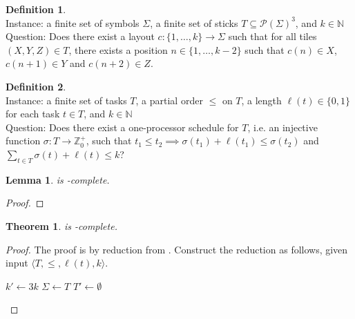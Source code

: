 \documentclass{article}
\newtheorem{theorem}{Theorem}[section]
\newtheorem{lemma}[lemma]{Lemma}
\theoremstyle{definition} \newtheorem{definition}[definition]{Definition}
\newcommand{\powerset}[1]{\mathcal{P}(#1)} %
\newenvironment{langdef}[1]{\begin{definition}{\lang{#1}}}{\end{definition}}
\newenvironment{instance}{\\Instance:}{}
\newenvironment{question}{\\Question:}{}
\begin{document}
  \begin{langdef}{3USTICKS}\label{def:3usticks}
    \begin{instance}
      a finite set of symbols $\Sigma$, a finite set of sticks
      $T\subseteq\powerset{\Sigma}^3$, and $k\in\mathbb{N}$
    \end{instance}
    \begin{question}
      Does there exist a layout $c\colon\{1,\ldots,k\}\to\Sigma$ such that for
        all tiles $(X, Y, Z)\in T$, there exists a position
        $n\in\{1,\ldots,k-2\}$ such that $c(n)\in X$, $c(n+1)\in Y$ and
        $c(n+2)\in Z$.
    \end{question}
  \end{langdef}

  \begin{langdef}{UNITSEQUENCING}\label{def:useq}
    \begin{instance}
      a finite set of tasks $T$, a partial order $\leq$ on $T$, a length
      $\ell(t)\in\{0,1\}$ for each task $t\in T$, and $k\in\mathbb{N}$
    \end{instance}
    \begin{question}
      Does there exist a one-processor schedule for $T$, i.e. an injective
      function $\sigma\colon T\to\mathbb{Z}_0^+$, such that $t_1\leq
      t_2\implies\sigma(t_1)+\ell(t_1)\leq\sigma(t_2)$ and $\sum_{t\in
        T}{\sigma(t)+\ell(t)}\leq k$?
    \end{question}
  \end{langdef}

  \begin{lemma}\label{lem:useqnpc}
     is \NP-complete.
  \end{lemma}
  \begin{proof}
  \end{proof}

  \begin{theorem}\label{thm:3usticksnpc}
     is \NP-complete.
  \end{theorem}
  \begin{proof}
    The proof is by reduction from . Construct the
    reduction as follows, given input $\langle T, \leq, \ell(t), k\rangle$.\\
    \begin{algorithm}[H]
      $k'\gets3k$\;
      $\Sigma\gets T$\;
      $T'\gets\emptyset$\;
    \end{algorithm}
  \end{proof}
\end{document}

